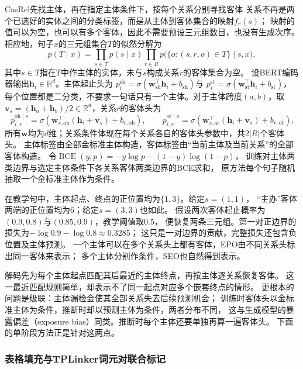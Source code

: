 CasRel先找主体，再在指定主体条件下，按每个关系分别寻找客体
关系不再是两个已选好的实体之间的分类标签，而是从主体到客体集合的映射$f_r(s)$；
映射的值可以为空，也可以有多个客体，因此不需要预设三元组数目，也没有生成次序。
相应地，句子$x$的三元组集合$T$的似然分解为
\[
  p(T\mid x)=\prod_{s\in T}p(s\mid x)
  \prod_{r\in R}p\bigl(\{o:(s,r,o)\in T\}\mid s,x\bigr),
\]
其中$s\in T$指在$T$中作主体的实体，未与$s$构成关系$r$的客体集合为空。
设BERT编码器输出$\bm{h}_i\in\mathbb{R}^{d}$。主体起止头为
$p_i^{\mathrm{sh}}=\sigma(\bm{w}_{\mathrm{sh}}^\top\bm{h}_i+b_{\mathrm{sh}})$与
$p_i^{\mathrm{st}}=\sigma(\bm{w}_{\mathrm{st}}^\top\bm{h}_i+b_{\mathrm{st}})$，
每个位置都是二分类，不要求一句话只有一个主体。对于主体跨度$(a,b)$，取
$\bm{v}_s=(\bm{h}_a+\bm{h}_b)/2\in\mathbb{R}^{d}$，关系$r$的客体头为
\begin{equation}
  p_{i,r}^{\mathrm{oh}\mid s}
  =\sigma\!\left(\bm{w}_{r,\mathrm{oh}}^\top
       (\bm{h}_i+\bm{v}_s)+b_{r,\mathrm{oh}}\right),
  \qquad
  p_{i,r}^{\mathrm{ot}\mid s}
  =\sigma\!\left(\bm{w}_{r,\mathrm{ot}}^\top
       (\bm{h}_i+\bm{v}_s)+b_{r,\mathrm{ot}}\right).
  \label{eq:nlp-extraction-casrel}
\end{equation}
所有$\bm{w}$均为$d$维；关系条件体现在每个关系各自的客体头参数中，共$2|R|$个客体头。
主体标签由全部金标准主体构造，客体标签由“当前主体及当前关系”的全部客体构造。
令$\operatorname{BCE}(y,p)=-y\log p-(1-y)\log(1-p)$，
训练对主体两类边界与选定主体条件下各关系客体两类边界的BCE求和，
原方法每个句子随机抽取一个金标准主体作为条件。

在教学句中，主体起点、终点的正位置均为$\{1,3\}$。给定$s=(1,1)$，
“主办”客体两端的正位置均为6；给定$s=(3,3)$也如此。
假设两次客体起止概率为$(0.9,0.8)$与$(0.85,0.9)$，教学阈值取0.5，
便恢复两条三元组。第一对正边界的损失为$-\log0.9-\log0.8\approx0.3285$；
这只是一对边界的贡献，完整损失还包含负位置及主体预测。
一个主体可以在多个关系头上都有客体，EPO由不同关系头标出同一客体来表示；
多个主体分别作条件，SEO也自然得到表示。

解码先为每个主体起点匹配其后最近的主体终点，再按主体逐关系恢复客体。
这一最近匹配规则简单，却表示不了同一起点对应多个嵌套终点的情形。
更根本的问题是级联：主体漏检会使其全部关系失去后续预测机会；
训练时客体头以金标准主体为条件，推断时却以预测主体为条件，两者分布不同，
这与生成模型的暴露偏差（exposure bias）同类。推断时每个主体还要单独再算一遍客体头。
下面的单阶段方法正是针对这两点。

\subsubsection{表格填充与TPLinker词元对联合标记}
\label{sec:nlp-extraction-tplinker}

